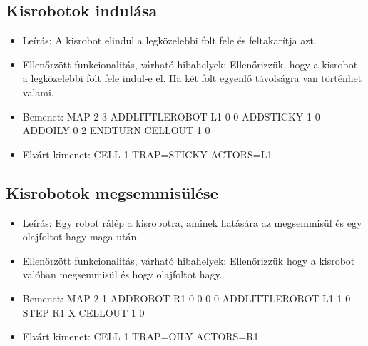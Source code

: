 \subsection{Kisrobotok indulása}
\begin{itemize}
	\item Leírás: \newline
	A kisrobot elindul a legközelebbi folt fele és feltakarítja azt.
	\item Ellenőrzött funkcionalitás, várható hibahelyek: \newline
	Ellenőrizzük, hogy a kisrobot a legközelebbi folt fele indul-e el. Ha két folt egyenlő távolságra van történhet valami.
	\item Bemenet: \newline
	MAP 2 3 \newline
	ADDLITTLEROBOT L1 0 0 \newline
	ADDSTICKY 1 0 \newline
	ADDOILY 0 2 \newline
	ENDTURN \newline
	CELLOUT 1 0 \newline
	\item Elvárt kimenet: \newline
	CELL 1 TRAP=STICKY ACTORS=L1 \newline
\end{itemize}

\subsection{Kisrobotok megsemmisülése}
\begin{itemize}
	\item Leírás: \newline
	Egy robot rálép a kisrobotra, aminek hatására az megsemmisül és egy olajfoltot hagy maga után.
	\item Ellenőrzött funkcionalitás, várható hibahelyek: \newline
	Ellenőrizzük hogy a kisrobot valóban megsemmisül és hogy olajfoltot hagy.
	\item Bemenet: \newline
	MAP 2 1 \newline
	ADDROBOT R1 0 0 0 0 \newline
	ADDLITTLEROBOT L1 1 0 \newline
	STEP R1 X \newline
	CELLOUT 1 0 \newline
	\item Elvárt kimenet: \newline
	CELL 1 TRAP=OILY ACTORS=R1 \newline
	
	
\end{itemize}

